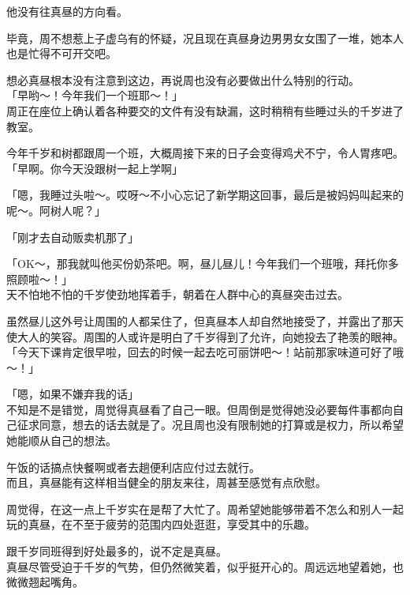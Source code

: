 他没有往真昼的方向看。

毕竟，周不想惹上子虚乌有的怀疑，况且现在真昼身边男男女女围了一堆，她本人也是忙得不可开交吧。

想必真昼根本没有注意到这边，再说周也没有必要做出什么特别的行动。\\

「早哟～！今年我们一个班耶～！」\\

周正在座位上确认着各种要交的文件有没有缺漏，这时稍稍有些睡过头的千岁进了教室。

今年千岁和树都跟周一个班，大概周接下来的日子会变得鸡犬不宁，令人胃疼吧。\\

「早啊。你今天没跟树一起上学啊」

「嗯，我睡过头啦～。哎呀～不小心忘记了新学期这回事，最后是被妈妈叫起来的呢～。阿树人呢？」

「刚才去自动贩卖机那了」

「OK～，那我就叫他买份奶茶吧。啊，昼儿昼儿！今年我们一个班哦，拜托你多照顾啦～！」\\

天不怕地不怕的千岁使劲地挥着手，朝着在人群中心的真昼突击过去。

虽然昼儿这外号让周围的人都呆住了，但真昼本人却自然地接受了，并露出了那天使大人的笑容。周围的人或许是明白了千岁得到了允许，向她投去了艳羡的眼神。\\

「今天下课肯定很早啦，回去的时候一起去吃可丽饼吧～！站前那家味道可好了哦～！」

「嗯，如果不嫌弃我的话」\\

不知是不是错觉，周觉得真昼看了自己一眼。但周倒是觉得她没必要每件事都向自己征求同意，想去的话去就是了。况且周也没有限制她的打算或是权力，所以希望她能顺从自己的想法。

午饭的话搞点快餐啊或者去趟便利店应付过去就行。\\

而且，真昼能有这样相当健全的朋友来往，周甚至感觉有点欣慰。

周觉得，在这一点上千岁实在是帮了大忙了。周希望她能够带着不怎么和别人一起玩的真昼，在不至于疲劳的范围内四处逛逛，享受其中的乐趣。

跟千岁同班得到好处最多的，说不定是真昼。\\

真昼尽管受迫于千岁的气势，但仍然微笑着，似乎挺开心的。周远远地望着她，也微微翘起嘴角。
